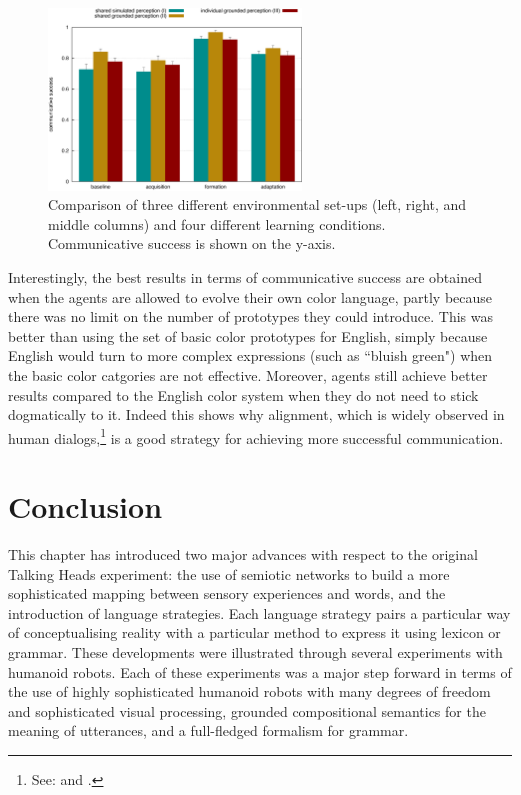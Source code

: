\begin{figure}[htbp]
  \centerline{\includegraphics[width=0.6\textwidth]{chap11/figs/grounding-comparison}}
\caption{ Comparison of three different environmental set-ups (left, right, and middle columns)
and four different learning conditions. Communicative success is shown on the y-axis.}
\label{fig:grounding-comparison} 
\end{figure}

Interestingly, the best results in terms of communicative success
are obtained when the agents are allowed to evolve their own color language, 
partly because there was no limit on the number of prototypes they could introduce. This was better 
than using the set of basic color prototypes for English, simply because English would turn to more complex expressions
(such as ``bluish green") when the basic color catgories are not effective. Moreover, 
agents still achieve better results compared to the English color system when they do not need to stick 
dogmatically to it. Indeed this shows why alignment, which is widely observed
in human dialogs,\footnote{See: \cite{Garrod:1987} and \cite{Galantucci:2005}.}
is a good strategy for achieving more successful communication. \\

\section{Conclusion}

This chapter has introduced two major advances with respect to the original Talking Heads experiment: 
the use of semiotic networks to build a more sophisticated mapping between sensory experiences and words, and the 
introduction of language strategies. Each language strategy pairs a particular way of conceptualising reality 
with a particular method to express it using lexicon or grammar. 
These developments were illustrated through several experiments with humanoid robots. Each of these experiments 
was a major step forward in terms of the use of 
highly sophisticated humanoid robots with many degrees of freedom and sophisticated visual processing, grounded compositional 
semantics for the meaning of utterances, and a full-fledged formalism for grammar. 


